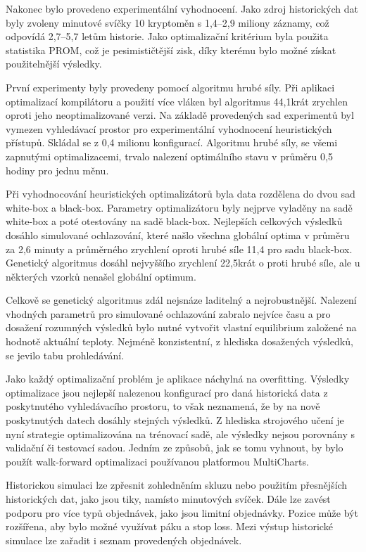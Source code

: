 Nakonec bylo provedeno experimentální vyhodnocení.
Jako zdroj historických dat byly zvoleny minutové svíčky 10 kryptoměn s 1,4--2,9 miliony záznamy, což odpovídá 2,7--5,7 letům historie.
Jako optimalizační kritérium byla použita statistika PROM, což je pesimističtější zisk, díky kterému bylo možné získat použitelnější výsledky.

První experimenty byly provedeny pomocí algoritmu hrubé síly.
Při aplikaci optimalizací kompilátoru a použití více vláken byl algoritmus 44,1krát zrychlen oproti jeho neoptimalizované verzi.
Na základě provedených sad experimentů byl vymezen vyhledávací prostor pro experimentální vyhodnocení heuristických přístupů.
Skládal se z 0,4 milionu konfigurací.
Algoritmu hrubé síly, se všemi zapnutými optimalizacemi, trvalo nalezení optimálního stavu v průměru 0,5 hodiny pro jednu měnu.

Při vyhodnocování heuristických optimalizátorů byla data rozdělena do dvou sad white-box a black-box.
Parametry optimalizátoru byly nejprve vyladěny na sadě white-box a poté otestovány na sadě black-box.
Nejlepších celkových výsledků dosáhlo simulované ochlazování, které našlo všechna globální optima v průměru za 2,6 minuty a průměrného zrychlení oproti hrubé síle 11,4 pro sadu black-box.
Genetický algoritmus dosáhl nejvyššího zrychlení 22,5krát o proti hrubé síle, ale u některých vzorků nenašel globální optimum.

Celkově se genetický algoritmus zdál nejsnáze laditelný a nejrobustnější.
Nalezení vhodných parametrů pro simulované ochlazování zabralo nejvíce času a pro dosažení rozumných výsledků bylo nutné vytvořit vlastní equilibrium založené na hodnotě aktuální teploty.
Nejméně konzistentní, z hlediska dosažených výsledků, se jevilo tabu prohledávání.

Jako každý optimalizační problém je aplikace náchylná na overfitting.
Výsledky optimalizace jsou nejlepší nalezenou konfigurací pro daná historická data z poskytnutého vyhledávacího prostoru, to však neznamená, že by na nově poskytnutých datech dosáhly stejných výsledků.
Z hlediska strojového učení je nyní strategie optimalizována na trénovací sadě, ale výsledky nejsou porovnány s validační či testovací sadou.
Jedním ze způsobů, jak se tomu vyhnout, by bylo použít walk-forward optimalizaci používanou platformou MultiCharts.

Historickou simulaci lze zpřesnit zohledněním skluzu nebo použitím přesnějších historických dat, jako jsou tiky, namísto minutových svíček.
Dále lze zavést podporu pro více typů objednávek, jako jsou limitní objednávky.
Pozice může být rozšířena, aby bylo možné využívat páku a stop loss.
Mezi výstup historické simulace lze zařadit i seznam provedených objednávek.

